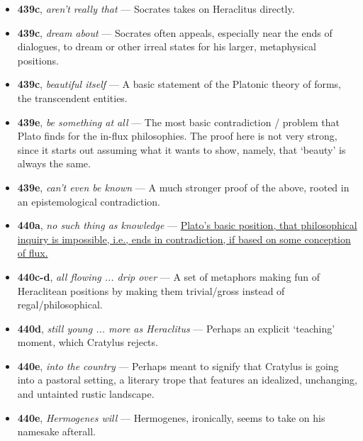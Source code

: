 \documentclass[12pt]{article}
\begin{document}
\begin{itemize}

\item \textbf{439c}, \textit{aren't really that} --- Socrates takes on Heraclitus directly.

\item \textbf{439c}, \textit{dream about} --- Socrates often appeals, especially near the ends of dialogues, to dream or other irreal states for his larger, metaphysical positions.

\item \textbf{439c}, \textit{beautiful itself} --- A basic statement of the Platonic theory of forms, the transcendent entities.

\item \textbf{439e}, \textit{be something at all} --- The most basic contradiction / problem that Plato finds for the in-flux philosophies. The proof here is not very strong, since it starts out assuming what it wants to show, namely, that `beauty' is always the same.

\item \textbf{439e}, \textit{can't even be known} --- A much stronger proof of the above, rooted in an epistemological contradiction.

\item \textbf{440a}, \textit{no such thing as knowledge} --- \ul{Plato's basic position, that philosophical inquiry is impossible, i.e., ends in contradiction, if based on some conception of flux.}

\item \textbf{440c-d}, \textit{all flowing ... drip over} --- A set of metaphors making fun of Heraclitean positions by making them trivial/gross instead of regal/philosophical.

\item \textbf{440d}, \textit{still young ... more as Heraclitus} --- Perhaps an explicit `teaching' moment, which Cratylus rejects.

\item \textbf{440e}, \textit{into the country} --- Perhaps meant to signify that Cratylus is going into a pastoral setting, a literary trope that features an idealized, unchanging, and untainted rustic landscape.

\item \textbf{440e}, \textit{Hermogenes will} --- Hermogenes, ironically, seems to take on his namesake afterall.

\end{itemize}
\end{document}
